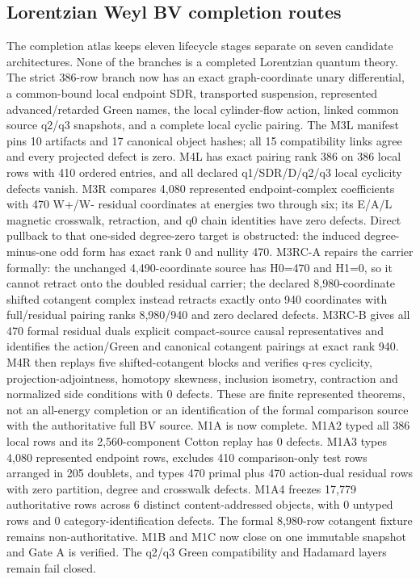 \subsection{Lorentzian Weyl BV completion routes}
\label{app:lorentzian-weyl-completion}
The completion atlas keeps eleven lifecycle stages separate on seven candidate architectures.  None of the branches is a completed Lorentzian quantum theory.  The strict 386-row branch now has an exact graph-coordinate unary differential, a common-bound local endpoint SDR, transported suspension, represented advanced/retarded Green names, the local cylinder-flow action, linked common source q2/q3 snapshots, and a complete local cyclic pairing.  The M3L manifest pins 10 artifacts and 17 canonical object hashes; all 15 compatibility links agree and every projected defect is zero.  M4L has exact pairing rank 386 on 386 local rows with 410 ordered entries, and all declared q1/SDR/D/q2/q3 local cyclicity defects vanish.  M3R compares 4,080 represented endpoint-complex coefficients with 470 W+/W- residual coordinates at energies two through six; its E/A/L magnetic crosswalk, retraction, and q0 chain identities have zero defects.  Direct pullback to that one-sided degree-zero target is obstructed: the induced degree-minus-one odd form has exact rank 0 and nullity 470.  M3RC-A repairs the carrier formally: the unchanged 4,490-coordinate source has H0=470 and H1=0, so it cannot retract onto the doubled residual carrier; the declared 8,980-coordinate shifted cotangent complex instead retracts exactly onto 940 coordinates with full/residual pairing ranks 8,980/940 and zero declared defects.  M3RC-B gives all 470 formal residual duals explicit compact-source causal representatives and identifies the action/Green and canonical cotangent pairings at exact rank 940.  M4R then replays five shifted-cotangent blocks and verifies q-res cyclicity, projection-adjointness, homotopy skewness, inclusion isometry, contraction and normalized side conditions with 0 defects.  These are finite represented theorems, not an all-energy completion or an identification of the formal comparison source with the authoritative full BV source.  M1A is now complete.  M1A2 typed all 386 local rows and its 2,560-component Cotton replay has 0 defects.  M1A3 types 4,080 represented endpoint rows, excludes 410 comparison-only test rows arranged in 205 doublets, and types 470 primal plus 470 action-dual residual rows with zero partition, degree and crosswalk defects.  M1A4 freezes 17,779 authoritative rows across 6 distinct content-addressed objects, with 0 untyped rows and 0 category-identification defects.  The formal 8,980-row cotangent fixture remains non-authoritative.  M1B and M1C now close on one immutable snapshot and Gate A is verified.  The q2/q3 Green compatibility and Hadamard layers remain fail closed.

